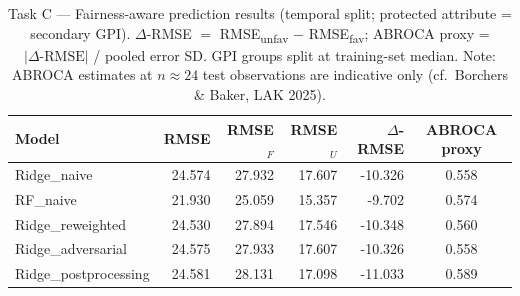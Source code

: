 \begin{table}[htbp]
\centering
\caption{Task C — Fairness-aware prediction results (temporal split; protected attribute = secondary GPI). $\Delta$-RMSE $= $ RMSE\textsubscript{unfav} $-$ RMSE\textsubscript{fav}; ABROCA proxy = $|\Delta\text{-RMSE}|$ / pooled error SD. GPI groups split at training-set median. Note: ABROCA estimates at $n \approx 24$ test observations are indicative only (cf.\ Borchers \& Baker, LAK 2025).}
\label{tab:taskC}
\begin{tabular}{lrrrrc}
\toprule
Model & RMSE & RMSE$_F$ & RMSE$_U$ & $\Delta$-RMSE & ABROCA proxy \\
\midrule
Ridge\_naive & 24.574 & 27.932 & 17.607 & -10.326 & 0.558 \\
RF\_naive & 21.930 & 25.059 & 15.357 & -9.702 & 0.574 \\
Ridge\_reweighted & 24.530 & 27.894 & 17.546 & -10.348 & 0.560 \\
Ridge\_adversarial & 24.575 & 27.933 & 17.607 & -10.326 & 0.558 \\
Ridge\_postprocessing & 24.581 & 28.131 & 17.098 & -11.033 & 0.589 \\
\bottomrule
\end{tabular}
\end{table}